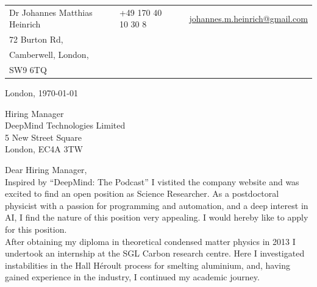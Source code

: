 \documentclass[10pt, a4paper]{class_cover_letter}
\begin{document}

\vspace{-0.8cm}


\begin{center}
\begin{table}[htpb]
\centering
\begin{tabular}{lllll}
 Dr Johannes Matthias Heinrich & \hspace{1.95cm} \textsc{\Large\icon{\Telefon}} & \hspace{0.01cm} +49 170 40 10 30 8 & \hspace{1.45cm} \textsc{\large\icon{@}} & \hspace{0.01cm} \href{mailto:johannes.m.heinrich@gmail.com}{johannes.m.heinrich@gmail.com}\\
72 Burton Rd, &  &  &  &  \\
Camberwell, London,  &  &  &  &  \\
SW9 6TQ &  &  &  & 
\end{tabular}
\end{table}
\end{center}


\hfill London, \today\\

\vspace{0.25cm}

Hiring Manager \\
DeepMind Technologies Limited\\
5 New Street Square\\
London, EC4A 3TW
	      
\vspace{1cm}

Dear Hiring Manager,\\

Inspired by ``DeepMind: The Podcast'' I vistited the company website and was excited to find an open position as Science Researcher. As a postdoctoral physicist with a passion for programming and automation, and a deep interest in AI, I find the nature of this position very appealing. I would hereby like to apply for this position.\\

After obtaining my diploma in theoretical condensed matter physics in 2013 I undertook an internship at the SGL Carbon research centre. Here I investigated instabilities in the Hall H\'{e}roult process for smelting aluminium, and, having gained experience in the industry, I continued my academic journey.
\end{document}
